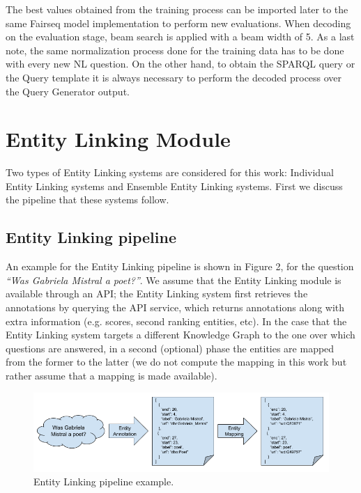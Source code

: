 The best values obtained from the training process can be imported later to the same Fairseq 
model implementation to perform new evaluations. When decoding on the evaluation stage, beam 
search is applied with a beam width of 5. As a last note, the same normalization process done 
for the training data has to be done with every new NL question. On the other hand, to obtain 
the SPARQL query or the Query template it is always necessary to perform the decoded process 
over the Query Generator output.

\section{Entity Linking Module}
Two types of Entity Linking systems are considered for this work: Individual Entity Linking 
systems and Ensemble Entity Linking systems. First we discuss the pipeline that these systems 
follow.

\subsection{Entity Linking pipeline}
An example for the Entity Linking pipeline is shown in Figure 2, for the question \textit{“Was 
Gabriela Mistral a poet?”}. We assume that the Entity Linking module is available through an 
API; the Entity Linking system first retrieves the annotations by querying the API service, 
which returns annotations along with extra information (e.g. scores, second ranking entities, 
etc). In the case that the Entity Linking system targets a different Knowledge Graph to the one 
over which questions are answered, in a second (optional) phase the entities are mapped from 
the former to the latter (we do not compute the mapping in this work but rather assume that a 
mapping is made available).

\begin{figure}[!h]
    \centering
    \includegraphics[scale=.45]{imagenes/3_system_overview/entityLinkingPipeline.png}
    \caption{Entity Linking pipeline example.}
    \label{fig:entityLinkingPipeline}
\end{figure}

